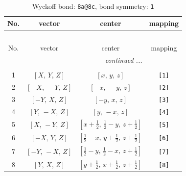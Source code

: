 \documentclass[fleqn,8pt]{jsarticle}
\begin{document}
\begin{longtable}{cccc}
\caption{Wyckoff bond: {\tt 8a@8c}, bond symmetry: {\tt 1}}
 \\
 \hline \hline
No. & vector & center & mapping \\ \hline \endfirsthead

\multicolumn{3}{l}{\tablename\ \thetable{}} \\
 \hline \hline
No. & vector & center & mapping \\ \hline \endhead

 \hline \hline
\multicolumn{3}{r}{\footnotesize\it continued ...} \\ \endfoot

 \hline \hline
\multicolumn{3}{r}{} \\ \endlastfoot

1 & $\left[ X,\, Y,\, Z \right]$ & $\left[ x,\, y,\, z \right]$ & {\tt [1]} \\ \hline
2 & $\left[ - X,\, - Y,\, Z \right]$ & $\left[ - x,\, - y,\, z \right]$ & {\tt [2]} \\ \hline
3 & $\left[ - Y,\, X,\, Z \right]$ & $\left[ - y,\, x,\, z \right]$ & {\tt [3]} \\ \hline
4 & $\left[ Y,\, - X,\, Z \right]$ & $\left[ y,\, - x,\, z \right]$ & {\tt [4]} \\ \hline
5 & $\left[ X,\, - Y,\, Z \right]$ & $\left[ x + \frac{1}{2},\, \frac{1}{2} - y,\, z + \frac{1}{2} \right]$ & {\tt [5]} \\ \hline
6 & $\left[ - X,\, Y,\, Z \right]$ & $\left[ \frac{1}{2} - x,\, y + \frac{1}{2},\, z + \frac{1}{2} \right]$ & {\tt [6]} \\ \hline
7 & $\left[ - Y,\, - X,\, Z \right]$ & $\left[ \frac{1}{2} - y,\, \frac{1}{2} - x,\, z + \frac{1}{2} \right]$ & {\tt [7]} \\ \hline
8 & $\left[ Y,\, X,\, Z \right]$ & $\left[ y + \frac{1}{2},\, x + \frac{1}{2},\, z + \frac{1}{2} \right]$ & {\tt [8]} \\
\end{longtable}
\end{document}
